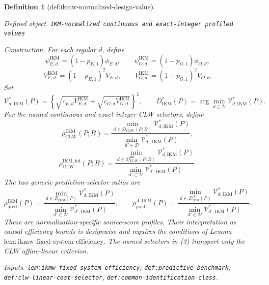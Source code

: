 \documentclass{article}
\newtheorem{definition}{Definition}
\begin{document}
\begin{definition}[def:ikmw-normalized-design-value]\label{def:ikmw-normalized-design-value}
\par\smallskip\noindent\emph{Defined object.} \texttt{IKM-\allowbreak{}normalized continuous and exact-\allowbreak{}integer profiled values}
\par\smallskip\noindent\emph{Construction.} For each regular \(d\), define
\[
 \psi_{E,d}^{\mathrm{IKM}}=(1-p_{E,1})\phi_{E,d},
 \qquad
 \psi_{O,d}^{\mathrm{IKM}}=(1-p_{O,1})\phi_{O,d},
\]
\[
 V_{E,d}^{\mathrm{IKM}}=(1-p_{E,1})^2V_{E,d},
 \qquad
 V_{O,d}^{\mathrm{IKM}}=(1-p_{O,1})^2V_{O,d}.               \tag{1}
\]
Set
\[
 \mathcal V_{d,\mathrm{IKM}}^*(P)=
 \left\{
 \sqrt{c_{E,d}V_{E,d}^{\mathrm{IKM}}}
 +\sqrt{c_{O,d}V_{O,d}^{\mathrm{IKM}}}
 \right\}^2,
 \qquad
 D_{\mathrm{IKM}}^*(P)=
 \arg\min_{d\in\mathcal D}\mathcal V_{d,\mathrm{IKM}}^*(P). \tag{2}
\]
For the named continuous and exact-integer CLW selectors, define
\[
 \rho_{\mathrm{CLW}}^{\mathrm{IKM}}(P;B)=
 \frac{\min_{d\in\mathcal D_{\mathrm{CLW}}(P;B)}
 \mathcal V_{d,\mathrm{IKM}}^*(P)}
 {\min_{d'\in\mathcal D}\mathcal V_{d',\mathrm{IKM}}^*(P)},
\]
\[
 \rho_{\mathrm{CLW}}^{\mathrm{IKM,int}}(P;B)=
 \frac{\min_{d\in\mathcal D_{\mathrm{CLW}}^{\mathrm{int}}(P;B)}
 \mathcal V_{d,\mathrm{IKM}}^*(P)}
 {\min_{d'\in\mathcal D}\mathcal V_{d',\mathrm{IKM}}^*(P)}. \tag{3}
\]
The two generic prediction-selector ratios are
\[
 \rho_{\mathrm{pred}}^{\mathrm{IKM}}(P)=
 \frac{\min_{d\in\mathcal D_{\mathrm{pred}}(P)}
 \mathcal V_{d,\mathrm{IKM}}^*(P)}
 {\min_{d'\in\mathcal D}\mathcal V_{d',\mathrm{IKM}}^*(P)},
 \qquad
 \rho_{\mathrm{pred}}^{A,\mathrm{IKM}}(P)=
 \frac{\min_{d\in\mathcal D_{\mathrm{pred}}^A(P)}
 \mathcal V_{d,\mathrm{IKM}}^*(P)}
 {\min_{d'\in\mathcal D}\mathcal V_{d',\mathrm{IKM}}^*(P)}. \tag{4}
\]
These are normalization-specific source-score profiles.  Their interpretation as causal efficiency bounds is designwise and requires the conditions of Lemma~\(\mathrm{lem{:}ikmw\text{-}fixed\text{-}system\text{-}efficiency}\).  The named selectors in (3) transport only the CLW affine-linear criterion.
\par\smallskip\noindent\emph{Inputs.} \texttt{lem:\allowbreak{}ikmw-\allowbreak{}fixed-\allowbreak{}system-\allowbreak{}efficiency}; \texttt{def:\allowbreak{}predictive-\allowbreak{}benchmark}; \texttt{def:\allowbreak{}clw-\allowbreak{}linear-\allowbreak{}cost-\allowbreak{}selector}; \texttt{def:\allowbreak{}common-\allowbreak{}identification-\allowbreak{}class}.
\end{definition}
\end{document}
